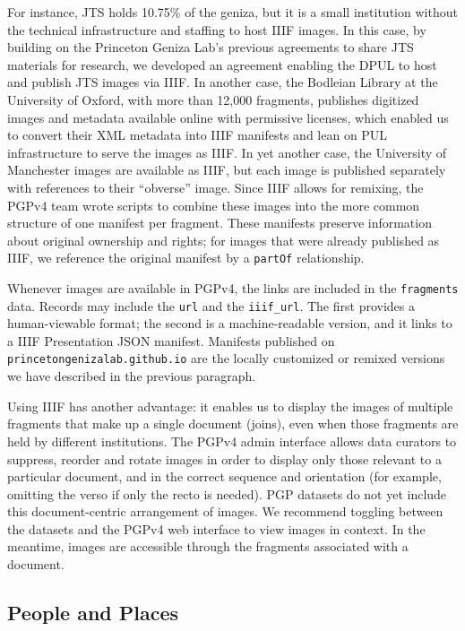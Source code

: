 \documentclass{article}
\begin{document}
For instance, JTS holds 10.75\% of the geniza, but it is a small institution without the technical infrastructure and staffing to host IIIF images. In this case, by building on the Princeton Geniza Lab’s previous agreements to share JTS materials for research, we developed an agreement enabling the DPUL to host and publish JTS images via IIIF. In another case, the Bodleian Library at the University of Oxford, with more than 12,000 fragments, publishes digitized images and metadata available online with permissive licenses, which enabled us to convert their XML metadata into IIIF manifests and lean on PUL infrastructure to serve the images as IIIF. In yet another case, the University of Manchester images are available as IIIF, but each image is published separately with references to their “obverse” image. Since IIIF allows for remixing, the PGPv4 team wrote scripts to combine these images into the more common structure of one manifest per fragment. These manifests preserve information about original ownership and rights; for images that were already published as IIIF, we reference the original manifest by a \texttt{partOf} relationship.

Whenever images are available in PGPv4, the links are included in the \texttt{fragments} data. Records may include the \texttt{url} and the \texttt{iiif\_url}. The first provides a human-viewable format; the second is a machine-readable version, and it links to a IIIF Presentation JSON manifest. Manifests published on \texttt{princetongenizalab.github.io} are the locally customized or remixed versions we have described in the previous paragraph.

Using IIIF has another advantage: it enables us to display the images of multiple fragments that make up a single document (joins), even when those fragments are held by different institutions. The PGPv4 admin interface allows data curators to suppress, reorder and rotate images in order to display only those relevant to a particular document, and in the correct sequence and orientation (for example, omitting the verso if only the recto is needed). PGP datasets do not yet include this document-centric arrangement of images. We recommend toggling between the datasets and the PGPv4 web interface to view images in context. In the meantime, images are accessible through the fragments associated with a document.

\subsection{People and Places}
\end{document}
